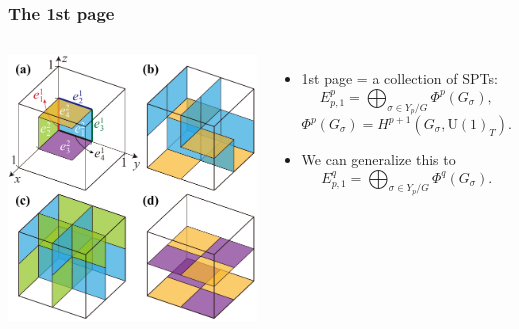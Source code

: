 \documentclass[xcolor=table, 10pt, aspectratio=43]{beamer}
\newcommand{\uone}{\mathrm U(1)}
\begin{document}
\begin{frame}
	\frametitle{The 1st page}

	\begin{columns}
		\begin{center}
			\includegraphics[width=\textwidth]{blocks}
		\end{center}
		\begin{itemize}
			\item 1st page = a collection of SPTs:
			\[E^p_{p,1} = \bigoplus_{\sigma\in Y_p/G} \Phi^p(G_\sigma),\]
			\[\Phi^p(G_\sigma) = H^{p+1}(G_\sigma, \uone_T).\]
			\item We can generalize this to
			\[E^q_{p,1} = \bigoplus_{\sigma\in Y_p/G} \Phi^q(G_\sigma).\]
		\end{itemize}
	\end{columns}
\end{frame}
\end{document}
